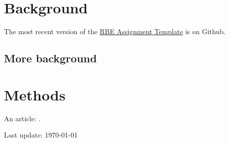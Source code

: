 \documentclass{RBEassignment}
\begin{document}
\def\RBEtitle{Creating an Assignment from the RBEassignment Class}
\def\RBEcourse{RBE-001 Generic RBE Course}
\def\RBEsemester{Fall 2021}
\def\RBEauthor{Daniel Montrallo Flickinger, PhD}
\def\RBEnumber{0}
\def\RBEdue{2021-01-01 @ 00:00 UTC}



\RBEassignmentheader{}



\section{Background}


The most recent version of the \href{https://github.com/dmflickinger/RBE550-assignment-template}{RBE Assignment Template} is on Github.  

\lipsum[2]

\subsection{More background}

\lipsum[3]

\section{Methods}

\lipsum[4]

An article: \cite{WSJrobotRescue}.






\printurls


\vspace{6em}
\begin{center}
{\small \sffamily Last update: \today}
\end{center}
\end{document}
